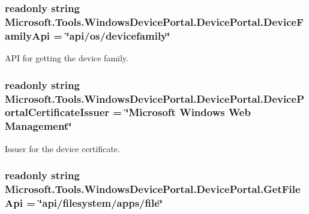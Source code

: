 \subsubsection[{\texorpdfstring{Device\+Family\+Api}{DeviceFamilyApi}}]{\setlength{\rightskip}{0pt plus 5cm}readonly string Microsoft.\+Tools.\+Windows\+Device\+Portal.\+Device\+Portal.\+Device\+Family\+Api = \char`\"{}api/os/devicefamily\char`\"{}\hspace{0.3cm}{\ttfamily [static]}}\hypertarget{class_microsoft_1_1_tools_1_1_windows_device_portal_1_1_device_portal_aaf5a2a13e142ef456e4e803cdd18bcdb}{}\label{class_microsoft_1_1_tools_1_1_windows_device_portal_1_1_device_portal_aaf5a2a13e142ef456e4e803cdd18bcdb}


A\+PI for getting the device family. 

\subsubsection[{\texorpdfstring{Device\+Portal\+Certificate\+Issuer}{DevicePortalCertificateIssuer}}]{\setlength{\rightskip}{0pt plus 5cm}readonly string Microsoft.\+Tools.\+Windows\+Device\+Portal.\+Device\+Portal.\+Device\+Portal\+Certificate\+Issuer = \char`\"{}Microsoft Windows Web Management\char`\"{}\hspace{0.3cm}{\ttfamily [static]}}\hypertarget{class_microsoft_1_1_tools_1_1_windows_device_portal_1_1_device_portal_a58775dec23c77183f38d90b2e784a1e9}{}\label{class_microsoft_1_1_tools_1_1_windows_device_portal_1_1_device_portal_a58775dec23c77183f38d90b2e784a1e9}


Issuer for the device certificate. 

\subsubsection[{\texorpdfstring{Get\+File\+Api}{GetFileApi}}]{\setlength{\rightskip}{0pt plus 5cm}readonly string Microsoft.\+Tools.\+Windows\+Device\+Portal.\+Device\+Portal.\+Get\+File\+Api = \char`\"{}api/filesystem/apps/file\char`\"{}\hspace{0.3cm}{\ttfamily [static]}}\hypertarget{class_microsoft_1_1_tools_1_1_windows_device_portal_1_1_device_portal_a8d486bbeae299edc6aa7def85d81a07f}{}\label{class_microsoft_1_1_tools_1_1_windows_device_portal_1_1_device_portal_a8d486bbeae299edc6aa7def85d81a07f}


